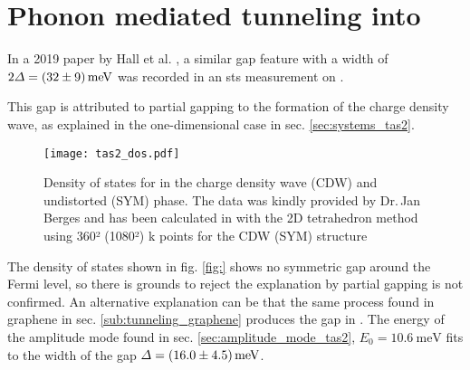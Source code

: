 \documentclass[main.tex]{subfiles}
\begin{document}
\section{Phonon mediated tunneling into \TaS}

In a 2019 paper by Hall et al. \cite{hall_environmental_2019}, a similar gap feature with a width of \(2 \Delta = \SI[separate-uncertainty = true]{32 \pm 9}{\milli\eV}\) was recorded in an \acrshort{sts} measurement on \TaS.

This gap is attributed to partial gapping to the formation of the charge density wave, as explained in the one-dimensional case in sec. \ref{sec:systems_tas2}.

\begin{figure}[htb!]
    \centering
    \texttt{[image: tas2\_dos.pdf]}
    \caption{Density of states for \TaS in the charge density wave (CDW) and undistorted (SYM) phase. The data was kindly provided by Dr.\,Jan Berges and has been calculated in \QE with the 2D tetrahedron method using 360² (1080²) k points for the CDW (SYM) structure}
    \label{fig:tas2_dos}
\end{figure}
The density of states shown in fig. \ref{fig:} shows no symmetric gap around the Fermi level, so there is grounds to reject the explanation by partial gapping is not confirmed.
An alternative explanation can be that the same process found in graphene in sec. \ref{sub:tunneling_graphene} produces the gap in \TaS.
The energy of the amplitude mode found in sec. \ref{sec:amplitude_mode_tas2}, \(E_0 = \SI{10.6}{\milli\eV}\) fits to the width of the gap \(\Delta = \SI[separate-uncertainty = true]{16 \pm 4.5}{\milli\eV}\).
\end{document}
